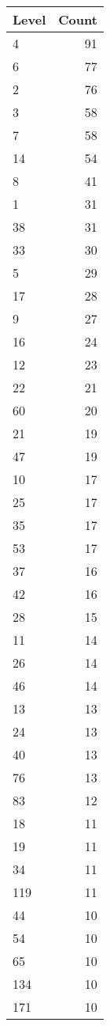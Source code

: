 \begin{table}[ht]
\centering
\begin{tabular}{lr}
  \hline
Level & Count \\ 
  \hline
4 &  91 \\ 
  6 &  77 \\ 
  2 &  76 \\ 
  3 &  58 \\ 
  7 &  58 \\ 
  14 &  54 \\ 
  8 &  41 \\ 
  1 &  31 \\ 
  38 &  31 \\ 
  33 &  30 \\ 
  5 &  29 \\ 
  17 &  28 \\ 
  9 &  27 \\ 
  16 &  24 \\ 
  12 &  23 \\ 
  22 &  21 \\ 
  60 &  20 \\ 
  21 &  19 \\ 
  47 &  19 \\ 
  10 &  17 \\ 
  25 &  17 \\ 
  35 &  17 \\ 
  53 &  17 \\ 
  37 &  16 \\ 
  42 &  16 \\ 
  28 &  15 \\ 
  11 &  14 \\ 
  26 &  14 \\ 
  46 &  14 \\ 
  13 &  13 \\ 
  24 &  13 \\ 
  40 &  13 \\ 
  76 &  13 \\ 
  83 &  12 \\ 
  18 &  11 \\ 
  19 &  11 \\ 
  34 &  11 \\ 
  119 &  11 \\ 
  44 &  10 \\ 
  54 &  10 \\ 
  65 &  10 \\ 
  134 &  10 \\ 
  171 &  10 \\ 

\end{tabular}
\end{table}
